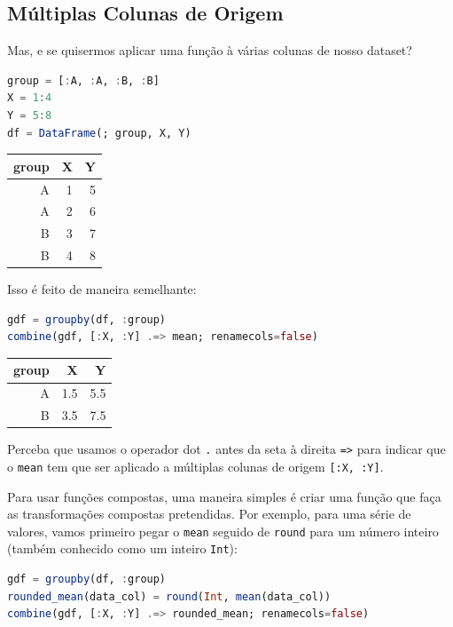 \documentclass[
  notoc %
]{tufte-book}
\newcommand{\passthrough}[1]{#1}
\begin{document}
\hypertarget{sec:groupby_combine_multiple_source}{%
\subsection{Múltiplas Colunas de
Origem}\label{sec:groupby_combine_multiple_source}}

Mas, e se quisermos aplicar uma função à várias colunas de nosso
dataset?

\begin{lstlisting}[language=Julia]
group = [:A, :A, :B, :B]
X = 1:4
Y = 5:8
df = DataFrame(; group, X, Y)
\end{lstlisting}

\begin{longtable}[]{@{}rrr@{}}
\toprule
group & X & Y \\
\midrule
\endhead
A & 1 & 5 \\
A & 2 & 6 \\
B & 3 & 7 \\
B & 4 & 8 \\
\bottomrule
\end{longtable}

Isso é feito de maneira semelhante:

\begin{lstlisting}[language=Julia]
gdf = groupby(df, :group)
combine(gdf, [:X, :Y] .=> mean; renamecols=false)
\end{lstlisting}

\begin{longtable}[]{@{}rrr@{}}
\toprule
group & X & Y \\
\midrule
\endhead
A & 1.5 & 5.5 \\
B & 3.5 & 7.5 \\
\bottomrule
\end{longtable}

Perceba que usamos o operador dot \passthrough{\lstinline!.!} antes da
seta à direita \passthrough{\lstinline!=>!} para indicar que o
\passthrough{\lstinline!mean!} tem que ser aplicado a múltiplas colunas
de origem \passthrough{\lstinline![:X, :Y]!}.

Para usar funções compostas, uma maneira simples é criar uma função que
faça as transformações compostas pretendidas. Por exemplo, para uma
série de valores, vamos primeiro pegar o \passthrough{\lstinline!mean!}
seguido de \passthrough{\lstinline!round!} para um número inteiro
(também conhecido como um inteiro \passthrough{\lstinline!Int!}):

\begin{lstlisting}[language=Julia]
gdf = groupby(df, :group)
rounded_mean(data_col) = round(Int, mean(data_col))
combine(gdf, [:X, :Y] .=> rounded_mean; renamecols=false)
\end{lstlisting}
\end{document}
